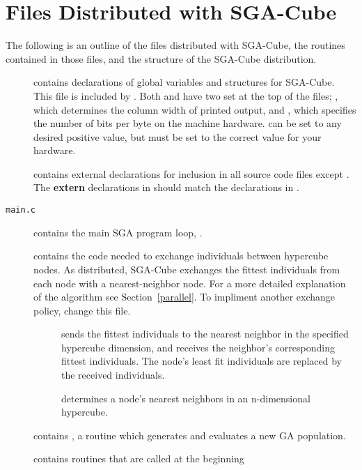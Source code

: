 \section{Files Distributed with SGA-Cube}
\label{files}
The following is an outline of the files distributed 
with SGA-Cube, the routines contained in those files, and the
{} structure of the SGA-Cube distribution.
\begin{description}
\item[{}] contains declarations of global variables and structures 
for SGA-Cube.  This file is included by {}.
Both {} and {} have two
{} set at the top of the files; {}, which determines the
column width of printed output, and {}, which specifies the number
of bits per byte on the machine hardware.  {} can be set to any
desired positive value, but {} must be set to the correct value for your
hardware.
\item[{}] contains external declarations for inclusion
in all source code files except {}.  The {\bf extern} declarations in {}
should match the declarations 
in {}.
\item[{\tt main.c}] contains the main SGA program loop, 
{}. 
\item[{}] contains the code needed to exchange
individuals between hypercube nodes.
As distributed, SGA-Cube exchanges  the fittest {} 
individuals from each node with a nearest-neighbor node.  
For a more 
detailed explanation of the algorithm see Section~\ref{parallel}.
To impliment another exchange policy, change this file.
\begin{description}
\item[{}]  sends the {} fittest individuals 
to the
nearest neighbor in the specified hypercube dimension, and receives the 
neighbor's
corresponding fittest individuals.  The node's least fit individuals 
are replaced
by the received individuals.
\item[{}] determines a node's {} nearest neighbors in an
n-dimensional hypercube.
\end{description}
\item[{}] contains {}, a routine which generates and 
evaluates a new GA population.  
\item[{}] contains routines that are called at the beginning 

\end{description}
